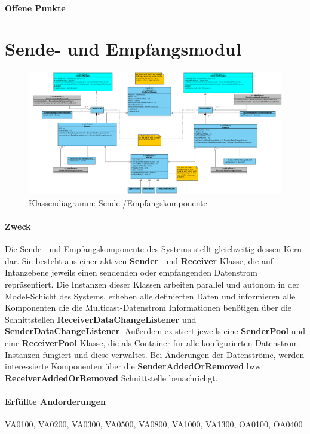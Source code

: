 \paragraph{Offene Punkte}

\section{Sende- und Empfangsmodul}
\label{sec:4:send}
\begin{figure}[H]
\includegraphics[width=18cm]{images/Model.png}
\centering
\caption{Klassendiagramm: Sende-/Empfangskomponente}
\label{uml_controller}
\end{figure}

\paragraph{Zweck}
Die Sende- und Empfangskomponente des Systems stellt gleichzeitig dessen Kern
dar. Sie besteht aus einer aktiven \textbf{Sender}- und \textbf{Receiver}-Klasse,
die auf Intanzebene jeweils einen sendenden oder empfangenden Datenstrom
repräsentiert. Die Instanzen dieser Klassen arbeiten parallel und autonom in der
Model-Schicht des Systems, erheben alle definierten Daten und informieren alle
Komponenten die die Multicast-Datenstrom Informationen benötigen über die
Schnittstellen \textbf{ReceiverDataChangeListener} und
\textbf{SenderDataChangeListener}. Außerdem existiert jeweils eine
\textbf{SenderPool} und eine \textbf{ReceiverPool} Klasse, die als Container für alle konfigurierten
Datenstrom-Instanzen fungiert und diese verwaltet. Bei Änderungen der
Datenströme, werden interessierte Komponenten über die \textbf{SenderAddedOrRemoved}
bzw \textbf{ReceiverAddedOrRemoved} Schnittstelle benachrichgt.
\paragraph{Erfüllte Andorderungen}
VA0100, VA0200, VA0300, VA0500, VA0800, VA1000, VA1300, OA0100, OA0400
